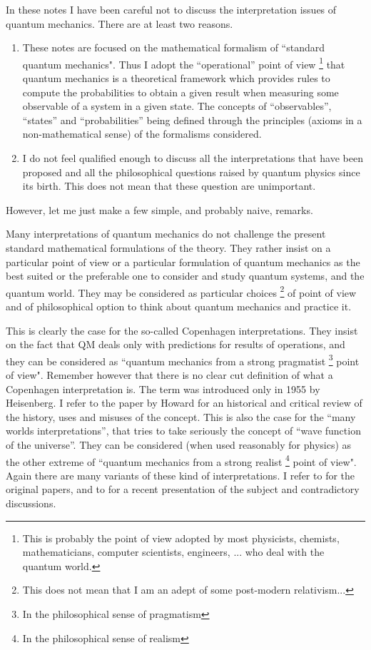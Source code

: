 In these notes I have been careful not to discuss the interpretation issues of quantum mechanics.
There are at least two reasons.
\begin{enumerate}
  \item These notes are focused on the mathematical formalism of ``standard quantum mechanics". Thus I adopt the ``operational'' point of view
\footnote{This is probably the point of view adopted by most physicists, chemists, mathematicians, computer scientists, engineers, ...  who deal with the quantum world.}
that quantum mechanics is a theoretical framework which provides rules to compute the probabilities to obtain a given result when measuring some observable of a system in a given state.  The concepts of ``observables'', ``states'' and ``probabilities'' being defined through the principles (axioms in a non-mathematical sense) of the formalisms considered.
  \item I do not feel qualified enough to discuss  all the interpretations that have been proposed  and all the philosophical questions raised by quantum physics since its birth. This does not mean that these question are unimportant.
 \end{enumerate}
 However, let me just make a few simple, and probably naive,  remarks.
 
 
Many interpretations of quantum mechanics do not challenge the present standard mathematical formulations of the theory.
They rather insist on a particular point of view or a particular formulation of quantum mechanics as the best suited or the preferable one to consider and study quantum systems, and the quantum world.
They may be considered as particular choices
 \footnote{This does not mean that I am an adept of some post-modern relativism...}
 of  point of view and of  philosophical option to think about quantum mechanics and practice it.
 
 
 This is clearly the case for the so-called Copenhagen interpretations. 
 They insist on the fact that QM deals only with predictions for results of operations, and they can be considered as ``quantum mechanics from a strong pragmatist 
 \footnote{In the philosophical sense of pragmatism}
 point of view".
Remember however that there is no clear cut definition of what a Copenhagen interpretation is. The term was introduced only in 1955 by Heisenberg. I refer to the paper by Howard \cite{Howard2004} for an historical and critical review of the history, uses and misuses of the concept.
 This is also  the case for the ``many worlds interpretations'', that tries to take seriously the concept of ``wave function of the universe''. 
They can be considered (when used reasonably for physics) as the other extreme of ``quantum mechanics from a strong realist 
 \footnote{In the philosophical sense of realism}
 point of view".
 Again there are many variants of these kind of interpretations. I refer to \cite{MWDeWittGraham73} for  the original papers, and to \cite{MW2010} for a recent  presentation of the subject and contradictory discussions.
 
